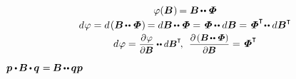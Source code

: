 \nopagebreak\begin{equation*}\begin{array}{c}
\varphi(\bm{B}\hspace{.1ex}) \hspace{-0.2ex}
= \bm{B} \hspace{-0.2ex} \dotdotp \hspace{-0.25ex} \scalebox{1.1}[1]{$\bm{\mathit{\Phi}}$}
\\[.2em]
%
d \hspace{.1ex} \varphi
= d \hspace{.2ex} ( \bm{B} \hspace{-0.2ex} \dotdotp \hspace{-0.25ex} \scalebox{1.1}[1]{$\bm{\mathit{\Phi}}$} \hspace{.1ex} ) \hspace{-0.2ex}
= d \bm{B} \hspace{-0.2ex} \dotdotp \hspace{-0.25ex} \scalebox{1.1}[1]{$\bm{\mathit{\Phi}}$}
= \hspace{-0.1ex} \scalebox{1.1}[1]{$\bm{\mathit{\Phi}}$} \hspace{-0.12ex} \dotdotp d \bm{B}
= \hspace{-0.1ex} \scalebox{1.1}[1]{$\bm{\mathit{\Phi}}$}^{\T} \hspace{-0.4ex} \dotdotp d \bm{B}^{\T}
\\[.2em]
%
d \hspace{.1ex} \varphi
= \scalebox{0.92}[0.92]{$\displaystyle \frac{\partial \hspace{.1ex} \varphi}{\partial \hspace{-0.1ex} \bm{B}} \dotdotp d \bm{B}^{\T}$} \hspace{-0.3ex} ,
\:\:
\scalebox{0.92}[0.92]{$\displaystyle \frac{\partial \hspace{-0.1ex} \left( \bm{B} \hspace{-0.2ex} \dotdotp \hspace{-0.25ex} \scalebox{1.1}[1]{$\bm{\mathit{\Phi}}$} \right)}{\partial \hspace{-0.1ex} \bm{B}}$}
= \hspace{-0.1ex} \scalebox{1.1}[1]{$\bm{\mathit{\Phi}}$}^{\T}
\end{array}\end{equation*}

${\bm{p} \dotp \hspace{-0.2ex} \bm{B} \hspace{-0.16ex} \dotp \hspace{-0.1ex} \bm{q} \hspace{.1ex} =
\hspace{-0.1ex} \bm{B} \hspace{-0.16ex} \dotdotp \hspace{-0.1ex} \bm{q} \bm{p}}$

